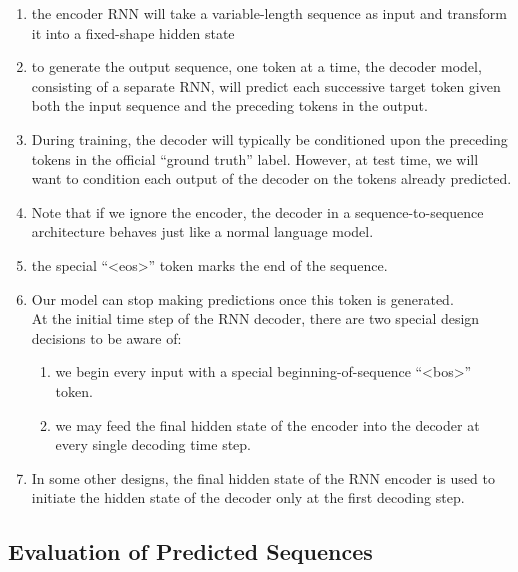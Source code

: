 \begin{enumerate}[itemsep=0.15cm]
    \item the encoder RNN will take a variable-length sequence as input and transform it into a fixed-shape hidden state

    \item to generate the output sequence, one token at a time, the decoder model, consisting of a separate RNN, will predict each successive target token given both the input sequence and the preceding tokens in the output. 
    
    \item During training, the decoder will typically be conditioned upon the preceding tokens in the official “ground truth” label. However, at test time, we will want to condition each output of the decoder on the tokens already predicted. 
    
    \item Note that if we ignore the encoder, the decoder in a sequence-to-sequence architecture behaves just like a normal language model.

    \item the special “<eos>” token marks the end of the sequence. 
    
    \item Our model can stop making predictions once this token is generated.\\
    At the initial time step of the RNN decoder, there are two special design decisions to be aware of: 
    \begin{enumerate}
        \item we begin every input with a special beginning-of-sequence “<bos>” token. 
    
        \item we may feed the final hidden state of the encoder into the decoder at every single decoding time step. 
    \end{enumerate}
    
    \item In some other designs, the final hidden state of the RNN encoder is used to initiate the hidden state of the decoder only at the first decoding step.


\end{enumerate}


\subsection{Evaluation of Predicted Sequences}


